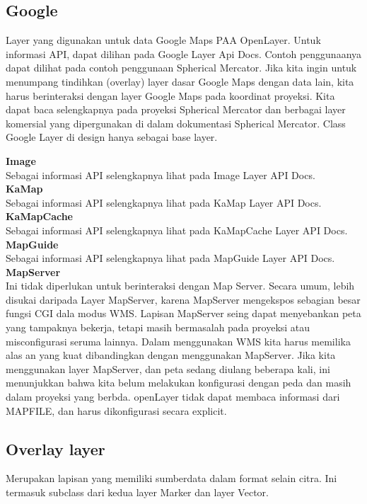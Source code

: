 \documentclass{article}
\begin{document}
\subsection {Google}
Layer yang digunakan untuk data Google Maps PAA OpenLayer. Untuk informasi API, dapat dilihan pada Google Layer Api Docs. 
Contoh penggunaanya dapat dilihat pada contoh penggunaan Spherical Mercator.
Jika kita ingin untuk menumpang tindihkan (overlay) layer dasar Google Maps dengan data lain, kita harus berinteraksi dengan layer Google Maps pada koordinat proyeksi.
Kita dapat baca selengkapnya pada proyeksi Spherical Mercator dan berbagai layer komersial yang dipergunakan di dalam dokumentasi Spherical Mercator.
Class Google Layer di design hanya sebagai base layer.

\textbf{Image} \\
Sebagai informasi API selengkapnya lihat pada Image Layer API Docs.\\
\textbf{KaMap} \\
Sebagai informasi API selengkapnya lihat pada KaMap Layer API Docs.\\
\textbf{KaMapCache} \\
Sebagai informasi API selengkapnya lihat pada KaMapCache Layer API Docs.\\
\textbf{MapGuide} \\
Sebagai informasi API selengkapnya lihat pada MapGuide Layer API Docs.\\
\textbf{MapServer} \\
Ini tidak diperlukan untuk berinteraksi dengan Map Server. Secara umum, lebih disukai daripada Layer MapServer, karena MapServer mengekspos sebagian besar fungsi CGI dala modus WMS.
Lapisan MapServer seing dapat menyebankan peta yang tampaknya bekerja, tetapi masih bermasalah pada proyeksi atau misconfigurasi seruma lainnya.
Dalam menggunakan WMS kita harus memilika alas an yang kuat dibandingkan dengan menggunakan MapServer.
Jika kita menggunakan layer MapServer, dan peta sedang diulang beberapa kali, ini menunjukkan bahwa kita belum melakukan konfigurasi dengan peda dan masih dalam proyeksi yang berbda.
openLayer tidak dapat membaca informasi dari MAPFILE, dan harus dikonfigurasi secara explicit.\\

\subsection {Overlay layer}
Merupakan lapisan yang memiliki sumberdata dalam format selain citra. Ini termasuk subclass dari kedua layer Marker dan layer Vector.
\end{document}
